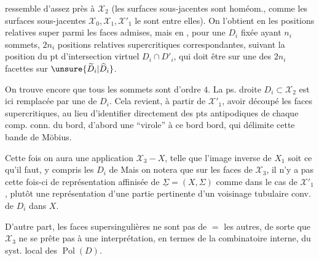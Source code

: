 
ressemble d'assez près à $\mathcal X_2$ (les surfaces sous-jacentes sont homéom.,  comme les surfaces sous-jacentes $\mathcal X_0,\mathcal X_1,\mathcal X'_1$ le sont entre elles). On l'obtient en  les positions relatives super parmi les faces admises, mais en , pour une $D_i$ fixée ayant $n_i$ sommets, $2n_i$ positions relatives supercritiques  correspondantes, suivant la position du pt d'intersection virtuel $D_i\cap D'_i$, qui doit être sur une des $2n_i$ facettes sur $\unsure{\widetilde D_i|\widehat D_i}$.

On trouve encore que tous les sommets sont d'ordre $4$. La  ps. droite $D_i\subset\mathcal X_2$ est ici remplacée par une  de $D_i$. Cela revient, à partir de $\mathcal X'_1$,   avoir découpé les faces supercritiques, au lieu d'identifier directement des pts antipodiques de chaque comp. conn. du bord,   d'abord  une ``virole'' à ce bord  bord, qui délimite cette bande de Möbius.

Cette fois on aura une application $\mathcal X_3\mathbin{-}X$, telle que l'image inverse de $X_1$ soit ce qu'il faut,  y compris les $D_i$ de  Mais on notera que sur les faces  de $\mathcal X_3$, il n'y a pas cette fois-ci de représentation affinisée de $\underline\Sigma=(X,\Sigma)$ comme dans le cas de $\mathcal X'_1$,  plutôt une représentation d'une partie pertinente d'un voisinage tubulaire conv. de $D_i$ dans $X$.

D'autre part, les  faces supersingulières ne sont pas de $=$  les autres, de sorte que $\mathcal X_3$ ne se prête pas à une interprétation, en termes de la combinatoire interne, du syst. local des $\operatorname{Pol}(D)$.

